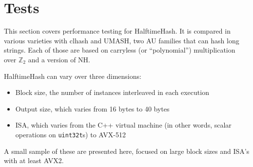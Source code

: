 \documentclass[sigconf, nonacm]{acmart}
\newcommand{\ints}{\mathbb{Z}}
\begin{document}




\section{Tests}

This section covers performance testing for HalftimeHash.
It is compared in various varieties with clhash and UMASH, two AU families that can hash long strings.
Each of those are based on carryless (or ``polynomial'') multiplication over $\ints_2$ and a version of NH.

HalftimeHash can vary over three dimensions:

\begin{itemize}
\item Block size, the number of instances interleaved in each execution
\item Output size, which varies from 16 bytes to 40 bytes
\item ISA, which varies from the C++ virtual machine (in other words, scalar operations on \texttt{uint32t}s) to AVX-512
\end{itemize}

A small sample of these are presented here, focused on large block sizes and ISA's with at least AVX2.
\end{document}
